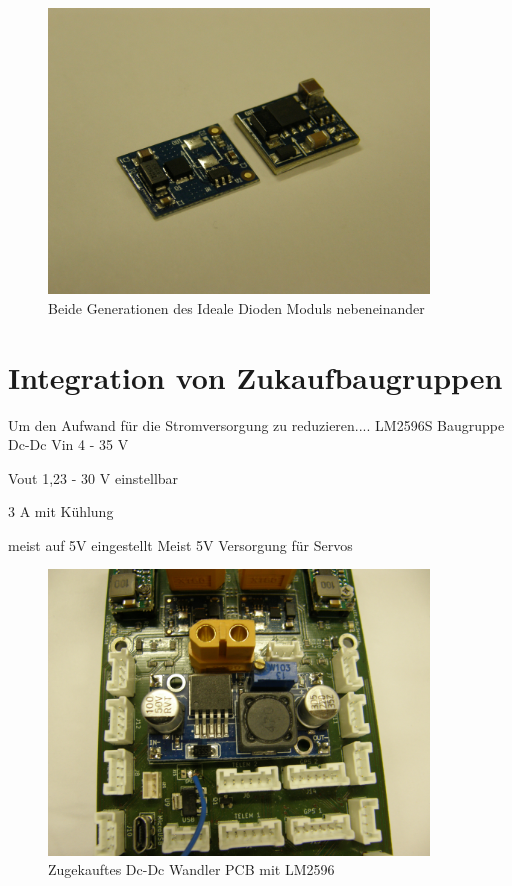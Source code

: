 \begin{figure}[H]
\centering
\includegraphics[width=0.9\textwidth]{bilder/Ideale_Diode/Ideale_Dioden_Paar_dreiviertel.jpg} 
\caption{Beide Generationen des Ideale Dioden Moduls nebeneinander} 
\label{fig:Beide Generationen des Ideale Dioden Moduls nebeneinander}
\end{figure}

\section{Integration von Zukaufbaugruppen}

Um den Aufwand für die Stromversorgung zu reduzieren....
LM2596S  Baugruppe Dc-Dc 
Vin 4 - 35 V 

Vout 1,23 - 30 V einstellbar

3 A  mit Kühlung

meist auf 5V  eingestellt 
Meist 5V Versorgung für Servos

\begin{figure}[H]
\centering
\includegraphics[width=0.9\textwidth]{bilder/Zukaufbauteile/Baugruppen_Dc-Dc_LM2596S.jpg} 
\caption{Zugekauftes Dc-Dc Wandler PCB mit LM2596} 
\label{fig:Zugekauftes Dc-Dc Wandler PCB mit LM2596}
\end{figure}




